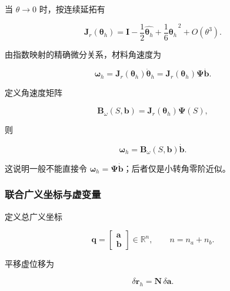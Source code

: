 当 \(\theta \rightarrow 0\) 时，按连续延拓有

\begin{equation}
\label{eq:galerkin-2-8}
\mathbf{J}_{r}\left( \bm{\theta}_{h} \right) = \mathbf{I} - \frac{1}{2}\widehat{\bm{\theta}_{h}} + \frac{1}{6}{\widehat{\bm{\theta}_{h}}}^{\, 2} + O\left( \theta^{3} \right).
\end{equation}

由指数映射的精确微分关系，材料角速度为

\begin{equation}
\label{eq:galerkin-2-9}
\bm{\omega}_{h} = \mathbf{J}_{r}\left( \bm{\theta}_{h} \right){\dot{\bm{\theta}}}_{h} = \mathbf{J}_{r}\left( \bm{\theta}_{h} \right)\bm{\Psi}\dot{\mathbf{b}}.
\end{equation}

定义角速度矩阵

\begin{equation}
\label{eq:galerkin-2-10}
\mathbf{B}_{\omega}\left( S,\mathbf{b} \right) = \mathbf{J}_{r}\left( \bm{\theta}_{h} \right)\bm{\Psi}(S),
\end{equation}

则

\begin{equation}
\label{eq:galerkin-2-11}
\bm{\omega}_{h} = \mathbf{B}_{\omega}\left( S,\mathbf{b} \right)\dot{\mathbf{b}}.
\end{equation}

这说明一般不能直接令 \(\bm{\omega}_{h} = \bm{\Psi}\dot{\mathbf{b}}\)；后者仅是小转角零阶近似。

\subsubsection{联合广义坐标与虚变量}\label{sec:galerkin-2-2-4}

定义总广义坐标

\begin{equation}
\label{eq:galerkin-2-12}
\mathbf{q} = \begin{bmatrix}
\mathbf{a} \\
\mathbf{b}
\end{bmatrix} \in \mathbb{R}^{n},\quad\quad n = n_{a} + n_{b}.
\end{equation}

平移虚位移为

\begin{equation}
\label{eq:galerkin-2-13}
\delta\mathbf{r}_{h} = \mathbf{N}\,\delta\mathbf{a}.
\end{equation}

